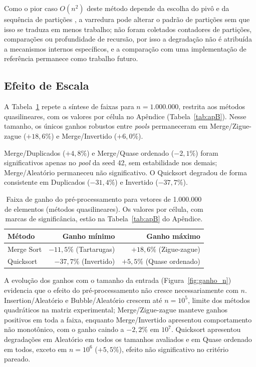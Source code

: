 \documentclass[12pt]{article}
\begin{document}
Como o pior caso $O(n^2)$ deste método depende da escolha do pivô e da sequência de partições \cite{cormen_introduction_2022}, a varredura pode alterar o padrão de partições sem que isso se traduza em menos trabalho; não foram coletados contadores de partições, comparações ou profundidade de recursão, por isso a degradação não é atribuída a mecanismos internos específicos, e a comparação com uma implementação de referência permanece como trabalho futuro.

\subsection{Efeito de Escala}\label{sec:escala}

A Tabela~\ref{tab:tempos1M} repete a síntese de faixas para $n=1.000.000$, restrita aos métodos quasilineares, com os valores por célula no Apêndice (Tabela~\ref{tab:apB}). Nesse tamanho, os únicos ganhos robustos entre \emph{pools} permaneceram em Merge/Zigue-zague ($+18,6\%$) e Merge/Invertido ($+6,0\%$).

Merge/Duplicados ($+4,8\%$) e Merge/Quase ordenado ($-2,1\%$) foram significativos apenas no \emph{pool} da seed 42, sem estabilidade nos demais; Merge/Aleatório permaneceu não significativo. O Quicksort degradou de forma consistente em Duplicados ($-31,4\%$) e Invertido ($-37,7\%$).

\begin{table}[htbp]
\centering
\caption{Faixa de ganho do pré-processamento para vetores de 1.000.000 de elementos (métodos quasilineares). Os valores por célula, com marcas de significância, estão na Tabela~\ref{tab:apB} do Apêndice.}
\label{tab:tempos1M}
\small
\begin{tabular}{lrr}
\hline
\textbf{Método} & \textbf{Ganho mínimo} & \textbf{Ganho máximo} \\
\hline
Merge Sort & $-11,5\%$ (Tartarugas) & $+18,6\%$ (Zigue-zague) \\
Quicksort & $-37,7\%$ (Invertido) & $+5,5\%$ (Quase ordenado) \\
\hline
\end{tabular}
\end{table}

A evolução dos ganhos com o tamanho da entrada (Figura~\ref{fig:ganho_n}) evidencia que o efeito do pré-processamento não cresce necessariamente com $n$. Insertion/Aleatório e Bubble/Aleatório crescem até $n=10^5$, limite dos métodos quadráticos na matriz experimental; Merge/Zigue-zague manteve ganhos positivos em toda a faixa, enquanto Merge/Invertido apresentou comportamento não monotônico, com o ganho caindo a $-2,2\%$ em $10^7$. Quicksort apresentou degradações em Aleatório em todos os tamanhos avaliados e em Quase ordenado em todos, exceto em $n=10^6$ ($+5,5\%$), efeito não significativo no critério pareado.
\end{document}
